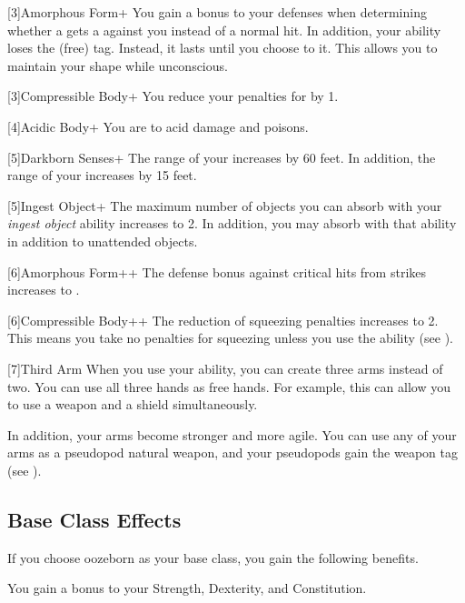     [3]{Amorphous Form+} You gain a  bonus to your defenses when determining whether a  gets a  against you instead of a normal hit.
      In addition, your  ability loses the  (free) tag.
      Instead, it lasts until you choose to  it.
      This allows you to maintain your shape while unconscious.

    [3]{Compressible Body+} You reduce your penalties for \squeezing by 1.

    [4]{Acidic Body+} You are  to acid damage and poisons.

    [5]{Darkborn Senses+} The range of your  increases by 60 feet.
      In addition, the range of your  increases by 15 feet.

    [5]{Ingest Object+} The maximum number of objects you can absorb with your \textit{ingest object} ability increases to 2.
      In addition, you may absorb  with that ability in addition to unattended objects.

    [6]{Amorphous Form++} The defense bonus against critical hits from strikes increases to .

    [6]{Compressible Body++} The reduction of squeezing penalties increases to 2.
      This means you take no penalties for squeezing unless you use the  ability (see ).

    [7]{Third Arm} When you use your  ability, you can create three arms instead of two.
      You can use all three hands as free hands.
      For example, this can allow you to use a  weapon and a shield simultaneously.

      In addition, your arms become stronger and more agile.
      You can use any of your arms as a pseudopod natural weapon, and your pseudopods gain the  weapon tag (see ).

  \subsection{Base Class Effects}
    If you choose oozeborn as your base class, you gain the following benefits.

      You gain a  bonus to your Strength, Dexterity, and Constitution.

